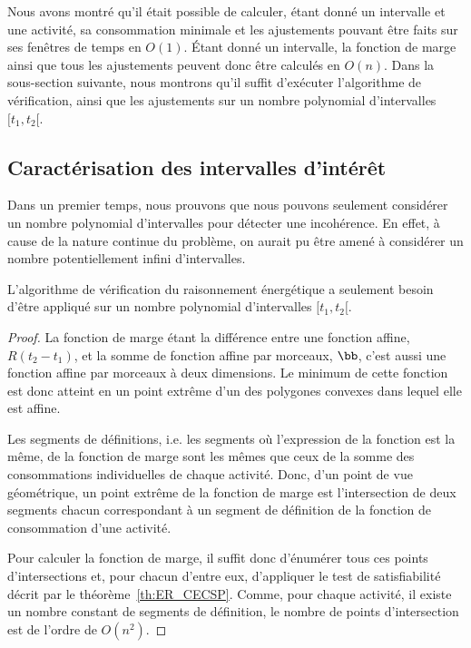 Nous avons montré qu'il était possible de calculer, étant donné un
intervalle et une activité, sa consommation minimale et les
ajustements pouvant être faits sur ses fenêtres de temps en
$O(1)$. {\'E}tant donné un intervalle, la fonction de marge ainsi que
tous les ajustements peuvent donc être calculés en $O(n)$. Dans la
sous-section suivante, nous montrons qu'il suffit d'exécuter l'algorithme
de vérification, ainsi que les ajustements sur un nombre polynomial
d'intervalles $[t_1,t_2[$.

\subsection{Caractérisation des intervalles d'intérêt}
\label{sec:intervalle_CECSP}
Dans un premier temps, nous prouvons que nous pouvons seulement
considérer un nombre polynomial d'intervalles pour détecter une
incohérence. En effet, à cause de la nature continue du problème, on
aurait pu être amené à considérer un nombre potentiellement infini
d'intervalles. 

\begin{theo}
  L'algorithme de vérification du raisonnement énergétique a seulement
  besoin d'être appliqué sur un nombre polynomial d'intervalles $[t_1,t_2[$.
\end{theo}

\begin{proof}
  La fonction de marge étant la différence entre une fonction affine,
  $R(t_2-t_1)$, et la somme de fonction affine par morceaux,
  $\bb$, c'est aussi une fonction affine par morceaux à deux
  dimensions. Le minimum de cette fonction est donc atteint en un point
  extrême d'un des polygones convexes dans lequel elle est
  affine. 

  Les segments de définitions, i.e. les segments où l'expression de la
  fonction est la même, de la fonction de marge sont les mêmes que ceux
  de la somme des consommations individuelles de chaque activité. Donc,
  d'un point de vue géométrique, un point extrême de la fonction de marge
  est l'intersection de deux segments chacun correspondant à un segment
  de définition de la fonction de consommation d'une activité. 

  Pour calculer la fonction de marge, il suffit donc d'énumérer tous
  ces points d'intersections et, pour chacun d'entre eux, d'appliquer le
  test de satisfiabilité décrit par le
  théorème~\ref{th:ER_CECSP}. Comme, pour chaque activité, il existe un
  nombre constant de segments de définition, le nombre de points
  d'intersection est de l'ordre de $O(n^2)$.
\end{proof}

